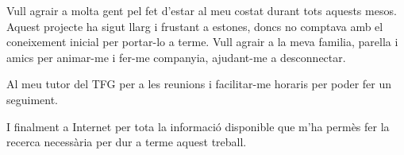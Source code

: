 \documentclass[10pt,a4paper,twocolumn,twoside]{article}
\begin{document}
Vull agrair a molta gent pel fet d'estar al meu costat durant tots aquests mesos.
Aquest projecte ha sigut llarg i frustant a estones, doncs no comptava amb el coneixement inicial per portar-lo a terme. Vull agrair a la meva familia, parella i amics per animar-me i fer-me companyia, ajudant-me a desconnectar.

Al meu tutor del TFG per a les reunions i facilitar-me horaris per poder fer un seguiment.

I finalment a Internet per tota la informació disponible que m'ha permès fer la recerca necessària per dur a terme aquest treball.




\end{document}
